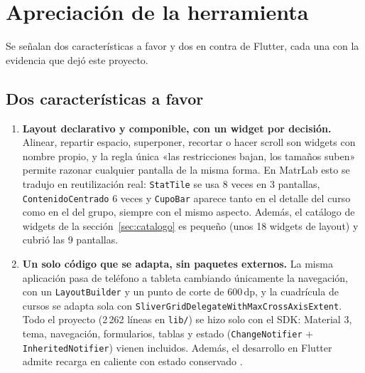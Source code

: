 \section{Apreciación de la herramienta}
\label{sec:apreciacion}

Se señalan dos características a favor y dos en contra de Flutter, cada una con la evidencia que dejó este proyecto.

\subsection{Dos características a favor}
\begin{enumerate}
	\item \textbf{Layout declarativo y componible, con un widget por decisión.} Alinear, repartir espacio, superponer, recortar o hacer scroll son widgets con nombre propio, y la regla única «las restricciones bajan, los tamaños suben» \cite{flutterconstr} permite razonar cualquier pantalla de la misma forma. En MatrLab esto se tradujo en reutilización real: \texttt{StatTile} se usa 8 veces en 3 pantallas, \texttt{ContenidoCentrado} 6 veces y \texttt{CupoBar} aparece tanto en el detalle del curso como en el del grupo, siempre con el mismo aspecto. Además, el catálogo de widgets de la sección~\ref{sec:catalogo} es pequeño (unos 18 widgets de layout) y cubrió las 9 pantallas.
	\item \textbf{Un solo código que se adapta, sin paquetes externos.} La misma aplicación pasa de teléfono a tableta cambiando únicamente la navegación, con un \texttt{LayoutBuilder} y un punto de corte de 600\,dp, y la cuadrícula de cursos se adapta sola con \texttt{SliverGridDelegateWithMaxCrossAxisExtent}. Todo el proyecto (2\,262 líneas en \texttt{lib/}) se hizo solo con el SDK: Material 3, tema, navegación, formularios, tablas y estado (\texttt{ChangeNotifier} + \texttt{InheritedNotifier}) vienen incluidos. Además, el desarrollo en Flutter admite recarga en caliente con estado conservado \cite{flutterarq}.
\end{enumerate}

